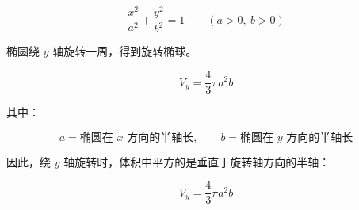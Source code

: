 
\[
	\frac{x^2}{a^2}+\frac{y^2}{b^2}=1
	\qquad (a>0,\ b>0)
\]

椭圆绕 \(y\) 轴旋转一周，得到旋转椭球。

\[
	V_y=\frac{4}{3}\pi a^2 b
\]

其中：

\[
	a=\text{椭圆在 }x\text{ 方向的半轴长},
	\qquad
	b=\text{椭圆在 }y\text{ 方向的半轴长}
\]

因此，绕 \(y\) 轴旋转时，体积中平方的是垂直于旋转轴方向的半轴：

\[
	\boxed{V_y=\frac{4}{3}\pi a^2 b}
\]